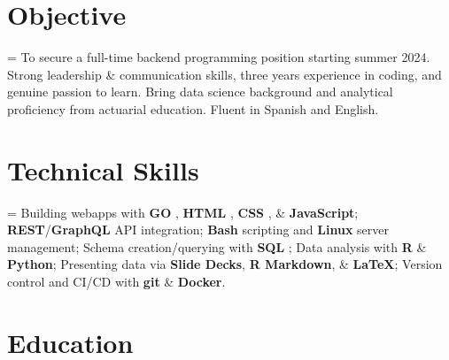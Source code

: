 \documentclass[12pt]{article}
\newcommand{\itemspace}[0]{
  \vspace{0.3170em}
}
\renewcommand{\textsc}[1]{%
  \uppercase{\footnotesize#1}\normalsize
}
\begin{document}
\maketitle

\itemspace

\vfill
\section{Objective}

\hangindent=\parindent %
To secure a full-time backend programming position starting summer 2024.
Strong leadership \& communication skills, three years experience in coding,
and genuine passion to learn. Bring data science background and analytical
proficiency from actuarial education. Fluent in Spanish and English.

\itemspace

\section{Technical Skills}

\hangindent=\parindent %
Building webapps with \textbf{\textsc{go}}, \textbf{\textsc{html}}, \textbf{\textsc{css}},
  \& \textbf{JavaScript};
\textbf{REST}/\textbf{GraphQL} API integration;
\textbf{Bash} scripting and \textbf{Linux} server management;
Schema creation/querying with \textbf{\textsc{sql}};
Data analysis with \textbf{\textsc{r}} \& \textbf{Python};
Presenting data via \textbf{Slide Decks}, \textbf{R Markdown},
  \& \textbf{\LaTeX{}};
Version control and CI/CD with \textbf{git} \& \textbf{Docker}.

\itemspace

\section{Education}

\end{document}
